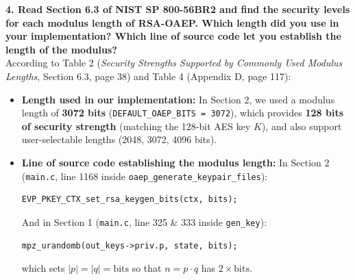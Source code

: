 \documentclass[10pt,twocolumn,letterpaper]{article}
\begin{document}
\vspace{0.5em}
\noindent\textbf{4. Read Section 6.3 of NIST SP 800-56BR2 and find the security levels for each modulus length of RSA-OAEP. Which length did you use in your implementation? Which line of source code let you establish the length of the modulus?} \\
According to Table 2 (\textit{Security Strengths Supported by Commonly Used Modulus Lengths}, Section 6.3, page 38) and Table 4 (Appendix D, page 117):

\begin{table}[H]
\centering
{}
\end{table}

\begin{itemize}
    \item \textbf{Length used in our implementation:} In Section 2, we used a modulus length of \textbf{3072 bits} (\texttt{DEFAULT\_OAEP\_BITS = 3072}), which provides \textbf{128 bits of security strength} (matching the 128-bit AES key $K$), and also support user-selectable lengths (2048, 3072, 4096 bits).
    \item \textbf{Line of source code establishing the modulus length:}
    In Section 2 (\texttt{main.c}, line 1168 inside \texttt{oaep\_generate\_keypair\_files}):
    \begin{verbatim}
EVP_PKEY_CTX_set_rsa_keygen_bits(ctx, bits);
    \end{verbatim}
    And in Section 1 (\texttt{main.c}, line 325 \& 333 inside \texttt{gen\_key}):
    \begin{verbatim}
mpz_urandomb(out_keys->priv.p, state, bits);
    \end{verbatim}
    which sets $|p|=|q|=\text{bits}$ so that $n = p \cdot q$ has $2 \times \text{bits}$.
\end{itemize}
\end{document}
